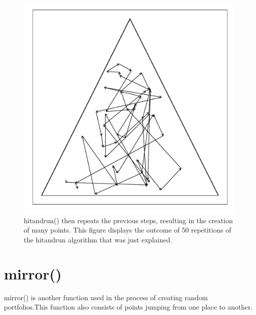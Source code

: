 \documentclass{article}\usepackage{graphicx, color}
\makeatletter
\def\maxwidth{ %
  \ifdim\Gin@nat@width>\linewidth
    \linewidth
  \else
    \Gin@nat@width
  \fi
}
\newenvironment{knitrout}{}{} %
\makeatother
\begin{document}
\begin{figure}[H]
\begin{knitrout}
\color{fgcolor}
\includegraphics[width=\maxwidth]{figure/hitandrun_walkthrough7} 

\end{knitrout}

\caption{hitandrun() then repeats the previous steps, resulting in the creation of many points. This figure displays the outcome of 50 repetitions of the hitandrun algorithm that was just explained.}
\end{figure}

\section*{mirror()}

mirror() is another function used in the process of creating random portfolios.This function also consists of points jumping from one place to another.
\end{document}

